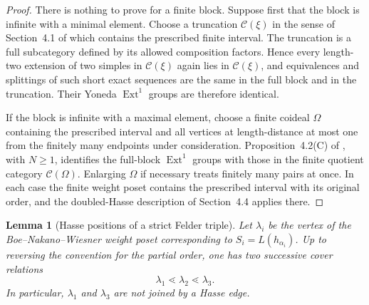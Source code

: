 \documentclass[12pt,leqno]{amsart}
\numberwithin{equation}{section}
\newtheorem{lem}[thm]{Lemma}
\newcommand{\Ext}{\operatorname{Ext}}
\begin{document}
\begin{proof}
There is nothing to prove for a finite block.  Suppose first that the
block is infinite with a minimal element.  Choose a truncation
$\mathcal C(\xi)$ in the sense of Section~4.1 of
\cite{BoeNakanoWiesner} which contains the prescribed finite interval.
The truncation is a full subcategory defined by its allowed composition
factors.  Hence every length-two extension of two simples in
$\mathcal C(\xi)$ again lies in $\mathcal C(\xi)$, and equivalences and
splittings of such short exact sequences are the same in the full block
and in the truncation.  Their Yoneda $\Ext^1$ groups are therefore
identical.

If the block is infinite with a maximal element, choose a finite coideal
$\Omega$ containing the prescribed interval and all vertices at
length-distance at most one from the finitely many endpoints under
consideration.  Proposition~4.2(C) of \cite{BoeNakanoWiesner}, with
$N\ge1$, identifies the full-block $\Ext^1$ groups with those in the
finite quotient category $\mathcal C(\Omega)$.  Enlarging $\Omega$ if
necessary treats finitely many pairs at once.  In each case the finite
weight poset contains the prescribed interval with its original order,
and the doubled-Hasse description of Section~4.4 applies there.
\end{proof}

\begin{lem}[Hasse positions of a strict Felder triple]
\label{lem:Felder-Hasse-chain}
Let $\lambda_i$ be the vertex of the Boe--Nakano--Wiesner weight poset
corresponding to $S_i=L(h_{\alpha_i})$.  Up to reversing the convention
for the partial order, one has two successive cover relations
\[
 \lambda_1\lessdot\lambda_2\lessdot\lambda_3.
\]
In particular, $\lambda_1$ and $\lambda_3$ are not joined by a Hasse
edge.
\end{lem}
\end{document}

